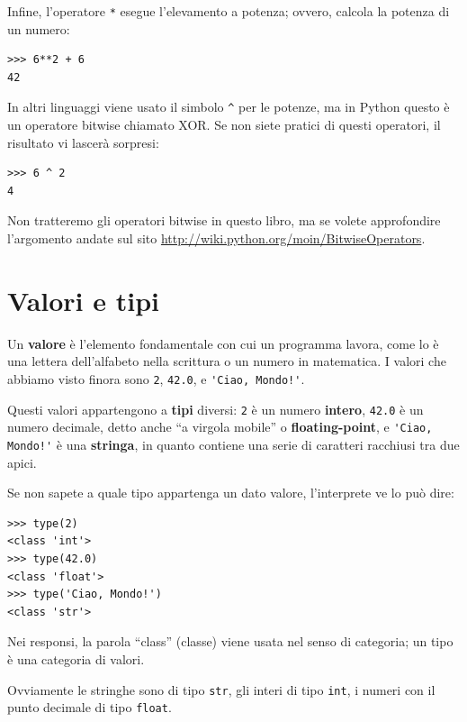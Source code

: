 \documentclass[10pt]{book}
\begin{document}
Infine, l'operatore {\tt **} esegue l'elevamento a potenza; ovvero, calcola la potenza di un numero:

\begin{verbatim}
>>> 6**2 + 6
42
\end{verbatim}
%
In altri linguaggi viene usato il simbolo \verb"^" per le potenze, ma in Python questo è un operatore bitwise chiamato XOR.  Se non siete pratici di questi operatori, il risultato vi lascerà sorpresi:

\begin{verbatim}
>>> 6 ^ 2
4
\end{verbatim}
%
Non tratteremo gli operatori bitwise in questo libro, ma se volete approfondire l'argomento andate sul sito \url{http://wiki.python.org/moin/BitwiseOperators}.

\section{Valori e tipi}

Un {\bf valore} è l'elemento fondamentale con cui un programma lavora, come lo è una lettera dell'alfabeto nella scrittura o un numero in matematica. I valori che abbiamo visto finora sono
{\tt 2}, {\tt 42.0}, e \verb"'Ciao, Mondo!'".

Questi valori appartengono a {\bf tipi} diversi:
{\tt 2} è un numero {\bf intero}, {\tt 42.0} è un numero decimale, detto anche ``a virgola mobile'' o {\bf floating-point}, e \verb"'Ciao, Mondo!'" è una {\bf stringa}, in quanto contiene una serie di caratteri racchiusi tra due apici.

Se non sapete a quale tipo appartenga un dato valore, l'interprete ve lo può dire:

\begin{verbatim}
>>> type(2)
<class 'int'>
>>> type(42.0)
<class 'float'>
>>> type('Ciao, Mondo!')
<class 'str'>
\end{verbatim}
%

Nei responsi, la parola ``class'' (classe) viene usata nel senso di categoria; un tipo è una categoria di valori.

Ovviamente le stringhe sono di tipo {\tt str}, gli interi di
tipo {\tt int}, i numeri con il punto decimale di tipo {\tt float}.
\end{document}
